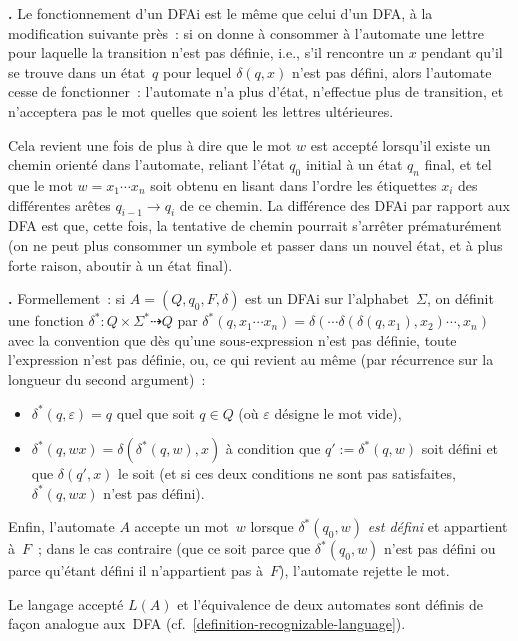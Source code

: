 \documentclass[12pt,a4paper]{article}
\theoremstyle{definition}
\newcommand\thingy{%
\refstepcounter{comcnt}\medskip\noindent\textbf{\thecomcnt.} }
\begin{document}
\thingy Le fonctionnement d'un DFAi est le même que celui d'un DFA, à
la modification suivante près : si on donne à consommer à l'automate
une lettre pour laquelle la transition n'est pas définie, i.e., s'il
rencontre un $x$ pendant qu'il se trouve dans un état $q$ pour lequel
$\delta(q,x)$ n'est pas défini, alors l'automate cesse de
fonctionner : l'automate n'a plus d'état, n'effectue plus de
transition, et n'acceptera pas le mot quelles que soient les lettres
ultérieures.

\smallskip

Cela revient une fois de plus à dire que le mot $w$ est accepté
lorsqu'il existe un chemin orienté dans l'automate, reliant l'état
$q_0$ initial à un état $q_n$ final, et tel que le mot $w = x_1 \cdots
x_n$ soit obtenu en lisant dans l'ordre les étiquettes $x_i$ des
différentes arêtes $q_{i-1} \to q_i$ de ce chemin.  La différence des
DFAi par rapport aux DFA est que, cette fois, la tentative de chemin
pourrait s'arrêter prématurément (on ne peut plus consommer un symbole
et passer dans un nouvel état, et à plus forte raison, aboutir à un
état final).

\thingy Formellement : si $A = (Q,q_0,F,\delta)$ est un DFAi sur
l'alphabet $\Sigma$, on définit une fonction $\delta^* \colon
Q\times\Sigma^* \dasharrow Q$ par $\delta^*(q,x_1\cdots x_n) =
\delta(\cdots\delta(\delta(q,x_1),x_2)\cdots,x_n)$ avec la convention
que dès qu'une sous-expression n'est pas définie, toute l'expression
n'est pas définie, ou, ce qui revient au même (par récurrence sur la
longueur du second argument) :
\begin{itemize}
\item $\delta^*(q,\varepsilon) = q$ quel que soit $q\in Q$ (où
  $\varepsilon$ désigne le mot vide),
\item $\delta^*(q,wx) = \delta(\delta^*(q,w),x)$ à condition que $q'
  := \delta^*(q,w)$ soit défini et que $\delta(q',x)$ le soit (et si
  ces deux conditions ne sont pas satisfaites, $\delta^*(q,wx)$ n'est
  pas défini).
\end{itemize}

Enfin, l'automate $A$ accepte un mot $w$ lorsque $\delta^*(q_0,w)$
\emph{est défini} et appartient à $F$ ; dans le cas contraire (que ce
soit parce que $\delta^*(q_0,w)$ n'est pas défini ou parce qu'étant
défini il n'appartient pas à $F$), l'automate rejette le mot.

\smallskip

Le langage accepté $L(A)$ et l'équivalence de deux automates sont
définis de façon analogue aux DFA
(cf. \ref{definition-recognizable-language}).
\end{document}
